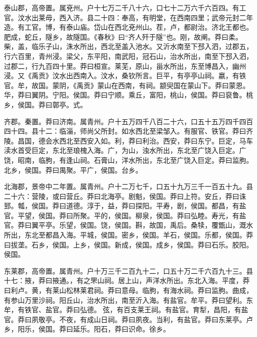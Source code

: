 \documentclass[12pt,UTF8]{ctexbook}
\begin{document}
泰山郡，高帝置。属兗州。户十七万二千八十六，口七十二万六千六百四。有工官。汶水出莱毋，西入济。县二十四：奉高，有明堂，在西南四里；武帝元封二年造。有工官。博，有泰山庙。岱山在西北兗州山。茬，卢，都尉治。济北王都也。肥成，蛇丘，隧乡，故隧国。《春秋》曰“齐人歼于隧”也。刚，故阐。莽曰柔。柴，盖，临乐子山，洙水所出，西北至盖入池水。又沂水南至下邳入泗，过郡五，行六百里，青州浸。梁父，东平阳，南武阳，冠石山，治水所出，南至下邳入泗，过郡二，行九百四十里。莽曰桓宣。莱芜，原山，甾水所出，东至博昌入，幽州浸。又《禹贡》汶水出西南入。汶水，桑钦所言。巨平，有亭亭山祠。嬴，有铁官。牟，故国。蒙阴，《禹贡》蒙山在西南，有祠。颛臾国在蒙山下。莽曰蒙恩。华，莽曰翼阴。宁阳。侯国。莽曰宁顺。乘丘，富阳，桃山，侯国。莽曰裒鲁。桃乡，侯国。莽曰鄣亭。式。



齐郡。秦置。莽曰济南。属青州。户十五万四千八百二十六，口五十五万四千四百四十四。县十二：临淄，师尚父所封。如水西北至梁邹入。有服官、铁官。莽曰齐陵。昌国，德会水西北至西安入如。利，莽曰利治。西安，莽曰东宁。巨定，马车渎水首受巨定，东北至琅槐入海。广，为山，浊水所出，东北至广饶入巨定。广饶，昭南，临朐，有逢山祠。石膏山，洋水所出，东北至广饶入巨定。莽曰监朐。北乡，侯国。莽曰禺聚。平广，侯国。台乡。



北海郡，景帝中二年置。属青州。户十二万七千，口五十九万三千一百五十九。县二十六：营陵，或曰营丘。莽曰北海亭。剧魁，侯国。莽曰上符。安丘，莽曰诛郅。瓡，侯国。莽曰道德。淳于，益，莽曰探阳。平寿，剧，侯国。都昌，有盐官。平望，侯国。莽曰所聚。平的，侯国。柳泉，侯国。莽曰弘睦。寿光，有盐官。莽曰翼平亭。乐望，侯国。饶，侯国。斟，故国，禹后。桑犊，覆甑山，溉水所出，东北至都昌入海。平城，侯国。密乡，侯国。羊石，侯国。乐都，侯国。莽曰拔垄。石乡，侯国。上乡，侯国。新成，侯国。成乡，侯国。莽曰石乐。胶阳。侯国。



东莱郡，高帝置。属青州。户十万三千二百九十二，口五十万二千六百九十三。县十七：掖，莽曰掖通。，有之罘山祠。居上山，声洋水所出。东北入海。平度，莽曰利卢。黄，有莱山松林莱君祠。莽曰意母。临朐，有海水祠。莽曰监朐。曲成，有参山万里沙祠。阳丘山，治水所出，南至沂入海。有盐官。牟平。莽曰望利。东牟，有铁官、盐官。莽曰弘德。弦，有百支莱王祠。有盐官。育犁，昌阳，有盐官。莽曰夙敬亭。不夜，有成山日祠。莽曰夙夜。当利，有盐官。莽曰东莱亭。卢乡，阳乐，侯国。莽曰延乐。阳石，莽曰识命。徐乡。
\end{document}
